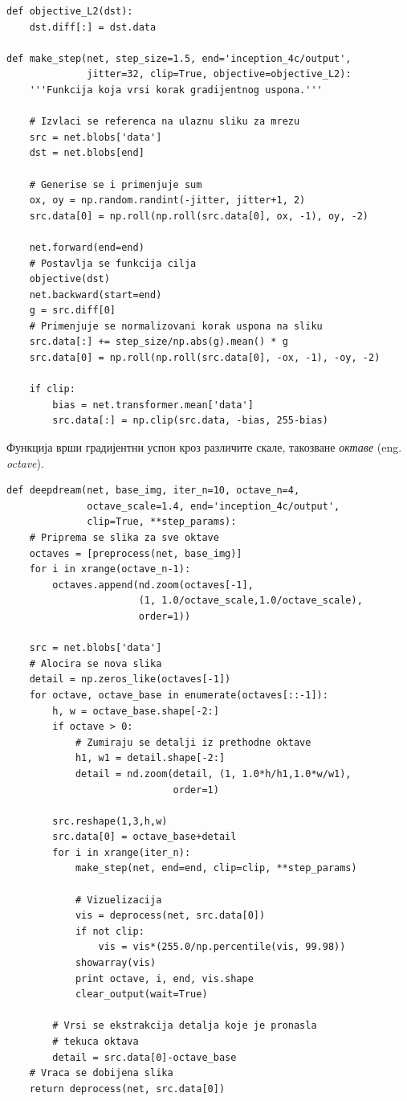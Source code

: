 \documentclass[a4paper]{article}
\begin{document}
\begin{verbatim}
def objective_L2(dst):
    dst.diff[:] = dst.data

def make_step(net, step_size=1.5, end='inception_4c/output',
              jitter=32, clip=True, objective=objective_L2):
    '''Funkcija koja vrsi korak gradijentnog uspona.'''

    # Izvlaci se referenca na ulaznu sliku za mrezu
    src = net.blobs['data']
    dst = net.blobs[end]

    # Generise se i primenjuje sum
    ox, oy = np.random.randint(-jitter, jitter+1, 2)
    src.data[0] = np.roll(np.roll(src.data[0], ox, -1), oy, -2)

    net.forward(end=end)
    # Postavlja se funkcija cilja
    objective(dst)
    net.backward(start=end)
    g = src.diff[0]
    # Primenjuje se normalizovani korak uspona na sliku
    src.data[:] += step_size/np.abs(g).mean() * g
    src.data[0] = np.roll(np.roll(src.data[0], -ox, -1), -oy, -2)

    if clip:
        bias = net.transformer.mean['data']
        src.data[:] = np.clip(src.data, -bias, 255-bias)
\end{verbatim}

Функција врши градијентни успон кроз различите скале, такозване \textit{октаве} (eng. \textit{octave}).

\begin{verbatim}
def deepdream(net, base_img, iter_n=10, octave_n=4,
              octave_scale=1.4, end='inception_4c/output',
              clip=True, **step_params):
    # Priprema se slika za sve oktave
    octaves = [preprocess(net, base_img)]
    for i in xrange(octave_n-1):
        octaves.append(nd.zoom(octaves[-1],
                       (1, 1.0/octave_scale,1.0/octave_scale),
                       order=1))

    src = net.blobs['data']
    # Alocira se nova slika
    detail = np.zeros_like(octaves[-1])
    for octave, octave_base in enumerate(octaves[::-1]):
        h, w = octave_base.shape[-2:]
        if octave > 0:
            # Zumiraju se detalji iz prethodne oktave
            h1, w1 = detail.shape[-2:]
            detail = nd.zoom(detail, (1, 1.0*h/h1,1.0*w/w1),
                             order=1)

        src.reshape(1,3,h,w)
        src.data[0] = octave_base+detail
        for i in xrange(iter_n):
            make_step(net, end=end, clip=clip, **step_params)

            # Vizuelizacija
            vis = deprocess(net, src.data[0])
            if not clip:
                vis = vis*(255.0/np.percentile(vis, 99.98))
            showarray(vis)
            print octave, i, end, vis.shape
            clear_output(wait=True)

        # Vrsi se ekstrakcija detalja koje je pronasla
        # tekuca oktava
        detail = src.data[0]-octave_base
    # Vraca se dobijena slika
    return deprocess(net, src.data[0])
\end{verbatim}
\end{document}
